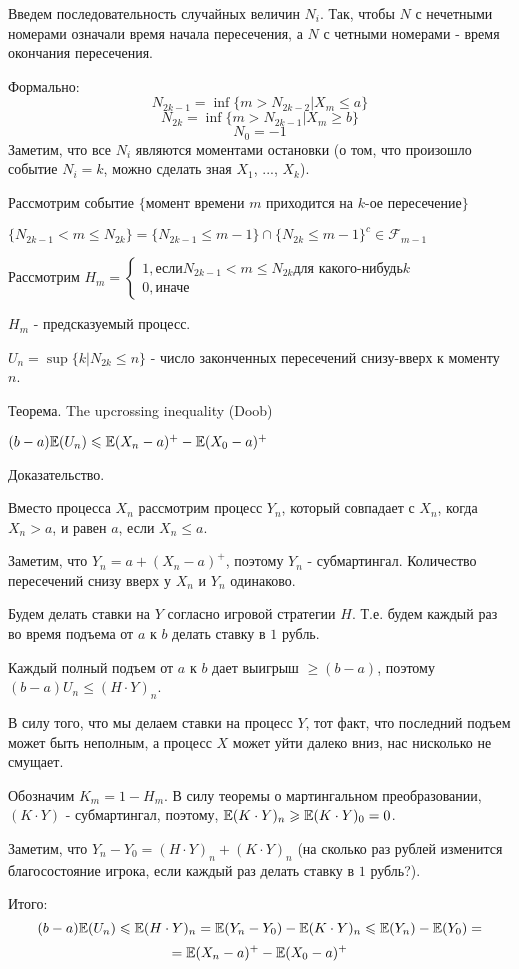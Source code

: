 {Введем последовательность случайных величин $N_{i}$. Так, чтобы
$N$ с нечетными номерами означали время начала пересечения, а $N$
с четными номерами - время окончания пересечения. \par
Формально:
$$
N_{2k-1}=\inf \{m>N_{2k-2}|X_{m}\le a\} $$ 
$$ N_{2k}=\inf
\{m>N_{2k-1}|X_{m}\ge b\} $$ 
$$
N_{0}=-1 
$$
Заметим, что все $N_{i}$ являются моментами остановки (о том, что
произошло событие $N_{i}=k$, можно сделать зная $X_{1}$, ...,
$X_{k}$). \par
Рассмотрим событие $\{$момент времени $m$ приходится на $k$-ое
пересечение$\}$ \par
$\{N_{2k-1}<m\le N_{2k}\}=\{N_{2k-1}\le m-1 \}\cap\{N_{2k}\le
m-1\}^{c} \in \mathcal{F}_{m-1}$ \par
Рассмотрим $H_{m}= \left\{
\begin{array}{rcl}
1, \text{если} N_{2k-1}<m\le N_{2k} \text{для какого-нибудь} k \\
0, \text{иначе}
\end{array}
\right. $ \par
$H_{m}$ - предсказуемый процесс. \par
$U_{n}=\sup \{k|N_{2k}\le n\}$ - число законченных пересечений
снизу-вверх к моменту $n$. \par
Теорема. The upcrossing inequality (Doob) \par
$(b-a)\mathbb{E}(U_{n})\leqslant \mathbb{E}(X_{n}-a)^{+}-\mathbb{E}(X_{0}-a)^{+}$ \par
Доказательство. \par
Вместо процесса $X_{n}$ рассмотрим процесс $Y_{n}$, который
совпадает с $X_{n}$, когда $X_{n}>a$, и равен $a$, если $X_{n}\le
a$. \par
Заметим, что $Y_{n}=a+(X_{n}-a)^{+}$, поэтому $Y_{n}$ -
субмартингал. Количество пересечений снизу вверх у $X_{n}$ и $Y_{n}$ одинаково. \par
Будем делать ставки на $Y$ согласно игровой стратегии $H$. Т.е.
будем каждый раз во время подъема от $a$ к $b$ делать ставку в $1$
рубль. \par
Каждый полный подъем от $a$ к $b$ дает выигрыш $\ge (b-a)$,
поэтому $(b-a)U_{n}\le (H\cdot Y)_{n}$. \par
В силу того, что мы делаем ставки на процесс $Y$, тот факт, что
последний подъем может быть неполным, а процесс $X$ может уйти
далеко вниз, нас нисколько не смущает. \par
Обозначим $K_{m}=1-H_{m}$. В силу теоремы о мартингальном
преобразовании, $(K\cdot Y)$
- субмартингал, поэтому, $\mathbb{E}(K\cdot Y)_{n} \geqslant \mathbb{E}(K\cdot Y)_{0}=0$.\par
Заметим, что $Y_{n}-Y_{0}=(H\cdot Y)_{n}+(K\cdot Y)_{n}$ (на
сколько раз рублей изменится благосостояние игрока, если каждый
раз делать ставку в $1$ рубль?). \par
Итого:
$$
(b-a)\mathbb{E}(U_{n})\leqslant \mathbb{E}(H\cdot Y)_{n} = \mathbb{E}(Y_{n}-Y_{0})-\mathbb{E}(K\cdot Y)_{n}
\leqslant \mathbb{E}(Y_{n})-\mathbb{E}(Y_{0})=$$ $$ =\mathbb{E}(X_{n}-a)^{+}-\mathbb{E}(X_{0}-a)^{+}
$$

}
